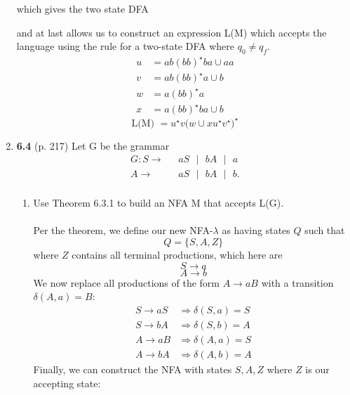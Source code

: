 \documentclass[12pt]{article}
\begin{document}
\begin{enumerate}
     which gives the two state DFA
     \begin{center}
     \end{center}
     
     and at last allows us to construct an expression L(M) which
     accepts the language using the rule for a two-state DFA where
     $q_0 \neq q_f$. 
     \begin{align*}
       u &= ab(bb)^{\star}ba \cup aa \\
       v &= ab(bb)^{\star}a \cup b \\
       w &= a(bb)^{\star}a \\
       x &= a(bb)^{\star}ba \cup b 
     \end{align*}
     \[\text{L(M) } = u^{\star}v\big(w \cup xu^{\star}v^{\star}\big)^{\star}\]
  

\newpage

\item \textbf{6.4} (p. 217) Let G be the grammar
  \begin{align*}
    G: S \rightarrow \text{ }& aS\text{ $\vert$ }bA\text{ $\vert$ }a \\
    A \rightarrow \text{ }& aS\text{ $\vert$ }bA\text{ $\vert$ }b. \\
  \end{align*}
  \begin{enumerate}
  \item Use Theorem 6.3.1 to build an NFA M that accepts L(G). \\ \\
    Per the theorem, we define our new NFA-$\lambda$ as having states
    $Q$ such that
    \[ Q = \{S,A,Z\} \]
    where $Z$ contains all terminal productions, which here are 
    \[S \rightarrow a \]
    \[A \rightarrow b \]
    We now replace all productions of the form $A \rightarrow aB$ with
    a transition $\delta(A,a)=B$:
    \begin{align*}
      S \rightarrow aS &\Rightarrow \delta(S,a) = S \\
      S \rightarrow bA &\Rightarrow \delta(S,b) = A \\
      A \rightarrow aB &\Rightarrow \delta(A,a) = S \\
      A \rightarrow bA &\Rightarrow \delta(A,b) = A 
    \end{align*}
    Finally, we can construct the NFA with states $S, A, Z$ where $Z$
    is our accepting state:
    

\end{enumerate}
\end{enumerate}
\end{document}
